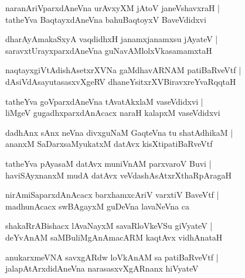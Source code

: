 \documentclass[twoside,12pt,openright]{book}
\newcounter{shloka}[chapter]
\begin{document}
\begin{shloka}%
naranAriVparxdAneVna urAvxyXM jAtoV janeVshavxraH |\\
tatheYva BaqtayxdAneVna bahuBaqtoyxV BaveVdidxvi
\end{shloka}

\begin{shloka}%
dharAyAmakaSxyA vaqdidhxH janamxjanamxsu jAyateV |\\
saravxtUrayxparxdAneVna guNavAMlolxVkasamamxtaH 
\end{shloka}

\begin{shloka}%
naqtayxgiVtAdishAsetxrXVNa gaMdhavARNAM patiBaRveVtf |\\
dAsiVdAsayutasasxvXgeRV dhaneYsitxrXVBiravxreYvaRqqtaH 
\end{shloka}

\begin{shloka}%
tatheYva goVparxdAneVna tAvatAkxlaM vaseVdidxvi |\\
liMgeV gugadhxparxdAnAcacx naraH kalapxM vaseVdidxvi
\end{shloka}

\begin{shloka}%
dadhAnx sAnx neVna divxguNaM GaqteVna tu shatAdhikaM |\\
ananxM SaDarxsaMyukatxM datAvx kisXtipatiBaRveVtf 
\end{shloka}

\begin{shloka}%
tatheYva pAyasaM datAvx muniVnAM parxvaroV Buvi |\\
haviSAyxnanxM mudA datAvx veVdashAsAtxrXthaRpAragaH 
\end{shloka}

\begin{shloka}%
nirAmiSaparxdAnAcacx barxhamxcAriV varxtiV BaveVtf |\\
madhunAcacx swBAgayxM guDeVna lavaNeVna ca 
\end{shloka}

\begin{shloka}%
shakaRrABishacx lAvaNayxM savaRloVkeVSu giVyateV |\\
deYvAnAM saMBuliMgAnAmacARM kaqtAvx vidhAnataH 
\end{shloka}

\begin{shloka}%
anukarxmeVNA savxgARdw loVkAnAM sa patiBaRveVtf |\\
jalapAtArxdidAneVna narasasxvXgARnanx hiVyateV 
\end{shloka}
\end{document}
